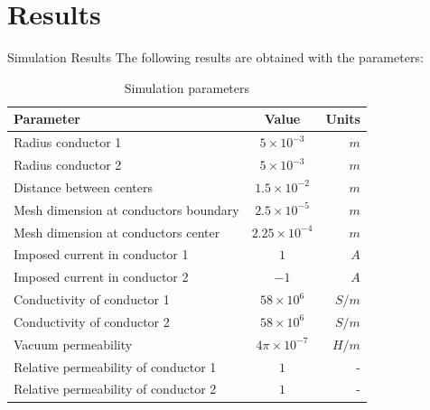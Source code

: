 \documentclass[aspectratio=54,xcolor=dvipsnames]{beamer}
\begin{document}
\section{Results}
\begin{frame}{Simulation Results}
    The following results are obtained with the parameters:
    \begin{table}[H]
    \centering
    \begin{tabular}{l c r}
      \toprule
      \textbf{Parameter} & \textbf{Value} & \textbf{Units} \\
      \midrule
        Radius conductor 1   & $5 \times 10^{-3}$         & $m$      \\
        Radius conductor 2   & $5 \times 10^{-3}$         & $m$      \\
        Distance between centers  & $1.5 \times 10^{-2}$       & $m$         \\
        Mesh dimension at conductors boundary & $2.5 \times 10^{-5}$  &  $m$  \\
        Mesh dimension at conductors center & $2.25 \times 10^{-4}$  &  $m$  \\
        Imposed current in conductor 1 & $1$        & $A$      \\
        Imposed current in conductor 2 & $-1$       & $A$    \\
        Conductivity of conductor 1  & $58 \times 10^6$ & $S/m$    \\
        Conductivity of conductor 2  & $58 \times 10^6$ & $S/m$    \\
        Vacuum permeability & $4\pi\times10^{-7}$ & $H/m$    \\
        Relative permeability of conductor 1 & $1$ & - \\
        Relative permeability of conductor 2 & $1$ & - \\
      \bottomrule
    \end{tabular}
    \caption{Simulation parameters}\label{tab: Parameters}
    \end{table}
\end{frame}
\end{document}
